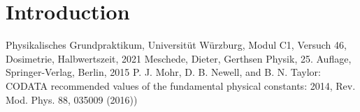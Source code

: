 \documentclass[a4paper,10pt,twocolumn]{article}
\begin{document}
    \section{Introduction}
    
    
    
    
    \begin{thebibliography}{}    %
         Physikalisches Grundpraktikum, Universitüt Würzburg, Modul C1, Versuch 46, Dosimetrie, Halbwertszeit, 2021
         Meschede, Dieter, Gerthsen Physik, 25. Auflage, Springer-Verlag, Berlin, 2015
         P. J. Mohr, D. B. Newell, and B. N. Taylor: \grqq CODATA
        recommended values of the fundamental physical constants: 2014\grqq , Rev. Mod. Phys.
        88, 035009 (2016))
    \end{thebibliography}
    
\end{document}

